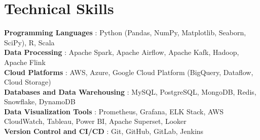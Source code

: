 \documentclass[letterpaper,10pt]{article}
\newcommand{\sectionspace}{
\vspace{-20pt}
}
\newcommand{\subheadingtitlevspace}{
\vspace{-3pt}
}
\newcommand{\titleItem}[1]{
  \textbf{#1}
}
\begin{document}
\section{Technical Skills}
\subheadingtitlevspace
 \begin{itemize}[leftmargin=0.15in, label={}]
    {\item{
     \titleItem{Programming Languages}{: Python (Pandas, NumPy, Matplotlib, Seaborn, SciPy), R, Scala} \\
     \titleItem{Data Processing}{: Apache Spark, Apache Airflow, Apache Kafk, Hadoop, Apache Flink} \\
     \titleItem{Cloud Platforms}{: AWS, Azure, Google Cloud Platform (BigQuery, Dataflow, Cloud Storage)} \\
     \titleItem{Databases and Data Warehousing}{: MySQL, PostgreSQL, MongoDB, Redis, Snowflake, DynamoDB} \\
     \titleItem{Data Visualization Tools}{: Prometheus, Grafana, ELK Stack, AWS CloudWatch, Tableau, Power BI, Apache Superset, Looker} \\
     \titleItem{Version Control and CI/CD}{: Git, GitHub, GitLab, Jenkins} \\
    }}
 \end{itemize}
\sectionspace





    
\end{document}

